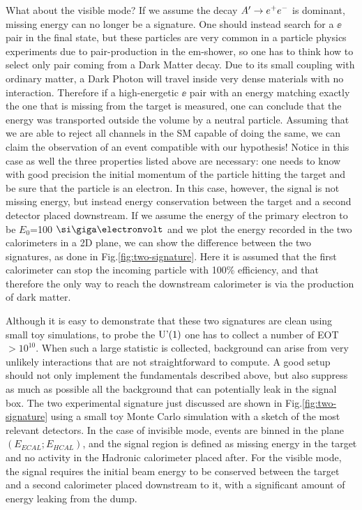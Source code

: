 What about the visible mode? If we assume the decay $A' \to e^+e^-$ is dominant, missing energy can no longer be a signature. One should instead search for a $\ee$ pair in the final state, but these particles are very common in a particle physics experiments due to pair-production in the em-shower, so one has to think how to select only pair coming from a Dark Matter decay. Due to its small coupling with ordinary matter, a Dark Photon will travel inside very dense materials with no interaction. Therefore if a high-energetic $\ee$ pair with an energy matching exactly the one that is missing from the target is measured, one can conclude that the energy was transported outside the volume by a neutral particle. Assuming that we are able to reject all channels in the SM capable of doing the same, we can claim the observation of an event compatible with our hypothesis! Notice in this case as well the three properties listed above are necessary: one needs to know with good precision the initial momentum of the particle hitting the target and be sure that the particle is an electron. In this case, however, the signal is not missing energy, but instead energy conservation between the target and a second detector placed downstream.
If we assume the energy of the primary electron to be $E_0$=100 $\gev$ and we plot the energy recorded in the two calorimeters in a 2D plane, we can show the difference between the two signatures, as done in Fig.\ref{fig:two-signature}. Here it is assumed that the first calorimeter can stop the incoming particle with 100\% efficiency, and that therefore the only way to reach the downstream calorimeter is via the production of dark matter.

Although it is easy to demonstrate that these two signatures are clean using small toy simulations, to probe the $\textrm{U'(1)}$ one has to collect a number of EOT $>10^{10}$. When such a large statistic is collected, background can arise from very unlikely interactions that are not straightforward to compute. A good setup should not only implement the fundamentals described above, but also suppress as much as possible all the background that can potentially leak in the signal box. The two experimental signature just discussed are shown in Fig.\ref{fig:two-signature} using a small toy Monte Carlo simulation with a sketch of the most relevant detectors. In the case of invisible mode, events are binned in the plane $(E_{ECAL};E_{HCAL})$, and the signal region is defined as missing energy in the target and no activity in the Hadronic calorimeter placed after. For the visible mode, the signal requires the initial beam energy to be conserved between the target and a second calorimeter placed downstream to it, with a significant amount of energy leaking from the dump.

